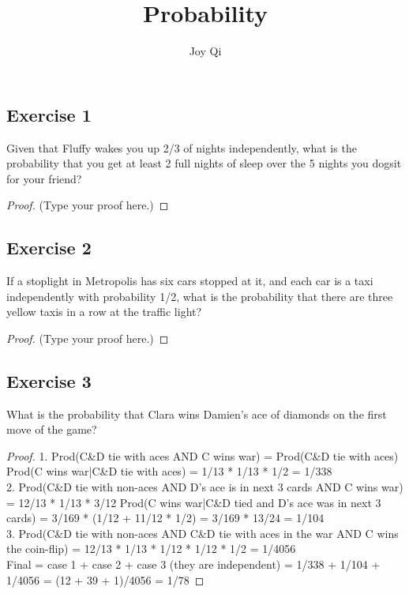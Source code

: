 \documentclass[12pt]{article}
\title{Probability}
\author{Joy Qi}
\begin{document}
\maketitle

\vspace{0.5in}



\subsection*{Exercise 1}
Given that Fluffy wakes you up 2/3 of nights independently, what is the probability that you get at least 2 full nights of sleep over the 5 nights you dogsit for your friend?

\begin{proof}
(Type your proof here.)
\end{proof}

\vspace{2in} %


\subsection*{Exercise 2}
If a stoplight in Metropolis has six cars stopped at it, and each car is a taxi independently with probability 1/2, what is the probability that there are three yellow taxis in a row at the traffic light?\\

\begin{proof}
(Type your proof here.)
\end{proof}

\subsection*{Exercise 3}
What is the probability that Clara wins Damien's ace of diamonds on the first move of the game? 
\begin{proof}
1. Prod(C\&D tie with aces AND C wins war) = Prod(C\&D tie with aces) Prod(C wins war|C\&D tie with aces) = 1/13 * 1/13 * 1/2 = 1/338 \\
2. Prod(C\&D tie with non-aces AND D's ace is in next 3 cards AND C wins war) = 12/13 * 1/13 * 3/12 Prod(C wins war|C\&D tied and D's ace was in next 3 cards) = 3/169 * (1/12 + 11/12 * 1/2) = 3/169 * 13/24 = 1/104 \\
3. Prod(C\&D tie with non-aces AND C\&D tie with aces in the war AND C wins the coin-flip) = 12/13 * 1/13 * 1/12 * 1/12 * 1/2 = 1/4056\\
Final = case 1 + case 2 + case 3 (they are independent) = 1/338 + 1/104 + 1/4056 = (12 + 39 + 1)/4056 = 1/78
\end{proof}
\end{document}

